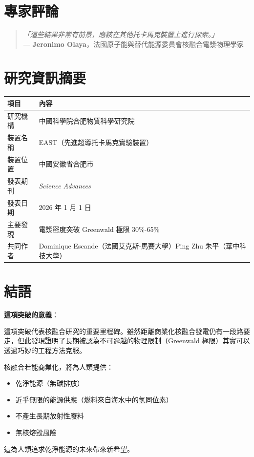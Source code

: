 \documentclass[11pt,a4paper]{article}
\begin{document}
\section{專家評論}

\begin{quote}
\textit{「這些結果非常有前景，應該在其他托卡馬克裝置上進行探索。」}\\
— \textbf{Jeronimo Olaya}，法國原子能與替代能源委員會核融合電漿物理學家
\end{quote}

\section{研究資訊摘要}

\begin{longtable}{p{4cm}p{10cm}}
\toprule
\textbf{項目} & \textbf{內容} \\
\midrule
\endfirsthead
\bottomrule
\endfoot
研究機構 & 中國科學院合肥物質科學研究院 \\
\midrule
裝置名稱 & EAST（先進超導托卡馬克實驗裝置） \\
\midrule
裝置位置 & 中國安徽省合肥市 \\
\midrule
發表期刊 & \textit{Science Advances} \\
\midrule
發表日期 & 2026 年 1 月 1 日 \\
\midrule
主要發現 & 電漿密度突破 Greenwald 極限 30\%-65\% \\
\midrule
共同作者 & Dominique Escande（法國艾克斯-馬賽大學）\newline Ping Zhu 朱平（華中科技大學） \\
\bottomrule
\end{longtable}

\section{結語}

\begin{importantbox}
\textbf{這項突破的意義}：

這項突破代表核融合研究的重要里程碑。雖然距離商業化核融合發電仍有一段路要走，但此發現證明了長期被認為不可逾越的物理限制（Greenwald 極限）其實可以透過巧妙的工程方法克服。

核融合若能商業化，將為人類提供：
\begin{itemize}[leftmargin=*,itemsep=2pt]
    \item 乾淨能源（無碳排放）
    \item 近乎無限的能源供應（燃料來自海水中的氫同位素）
    \item 不產生長期放射性廢料
    \item 無核熔毀風險
\end{itemize}

這為人類追求乾淨能源的未來帶來新希望。
\end{importantbox}
\end{document}

